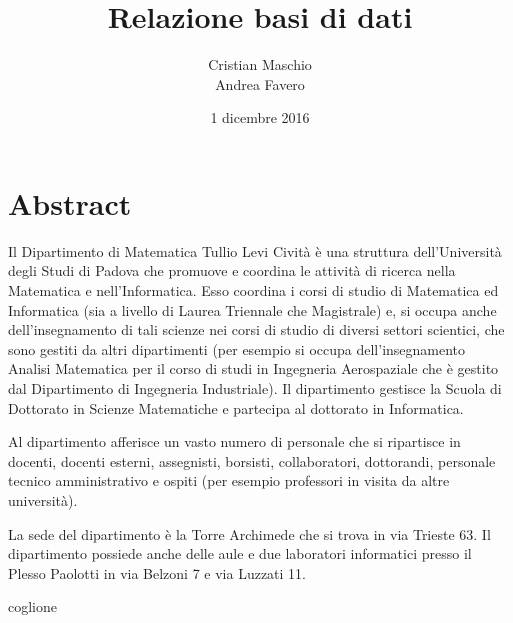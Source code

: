 \documentclass[a4paper, openany, 10pt]{book}
\begin{document}
\title{Relazione basi di dati}
\author{Cristian Maschio\\Andrea Favero}
\date{1 dicembre 2016}
\maketitle

\tableofcontents

\chapter{Abstract}
Il Dipartimento di Matematica Tullio Levi Cività è una struttura dell'Università degli Studi di Padova
che promuove e coordina le attività di ricerca nella Matematica e nell'Informatica. Esso coordina i
corsi di studio di Matematica ed Informatica (sia a livello di Laurea Triennale che Magistrale) e,
si occupa anche dell'insegnamento di tali scienze nei corsi di studio di diversi settori scientici, che
sono gestiti da altri dipartimenti (per esempio si occupa dell'insegnamento 
Analisi Matematica per il corso di studi in Ingegneria Aerospaziale che è gestito dal Dipartimento di Ingegneria Industriale).
Il dipartimento gestisce la Scuola di Dottorato in Scienze Matematiche e partecipa al dottorato in
Informatica. 

Al dipartimento afferisce un vasto numero di personale che si ripartisce in docenti, docenti esterni,
assegnisti, borsisti, collaboratori, dottorandi, personale tecnico amministrativo e ospiti (per esempio
professori in visita da altre università).

La sede del dipartimento è la Torre Archimede che si trova in via Trieste 63. Il dipartimento possiede
anche delle aule e due laboratori informatici presso il Plesso Paolotti in via Belzoni 7 e via Luzzati
11.

coglione
\end{document}
